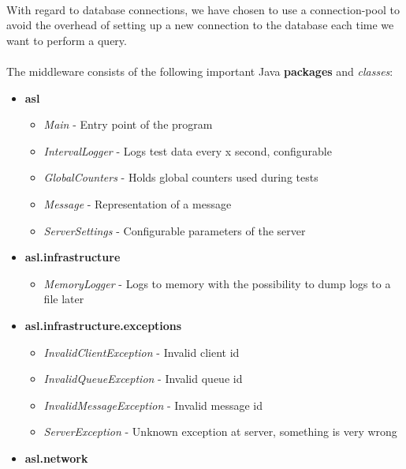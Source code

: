 \documentclass{article}
\begin{document}
            \\
            With regard to database connections, we have chosen to use a connection-pool to avoid the overhead of setting up a new connection to the database each time we want to perform a query.\\
            \\
            The middleware consists of the following important Java \textbf{packages} and \textit{classes}:
            \begin{itemize}
                \item \textbf{asl}
                \begin{itemize}
                    \item \textit{Main} - Entry point of the program
                    \item \textit{IntervalLogger} - Logs test data every x second, configurable
                    \item \textit{GlobalCounters} - Holds global counters used during tests
                    \item \textit{Message} - Representation of a message
                    \item \textit{ServerSettings} - Configurable parameters of the server
                \end{itemize}
                \item \textbf{asl.infrastructure}
                \begin{itemize}
                    \item \textit{MemoryLogger} - Logs to memory with the possibility to dump logs to a file later
                \end{itemize}
                \item \textbf{asl.infrastructure.exceptions}
                \begin{itemize}
                    \item \textit{InvalidClientException} - Invalid client id
                    \item \textit{InvalidQueueException} - Invalid queue id
                    \item \textit{InvalidMessageException} - Invalid message id
                    \item \textit{ServerException} - Unknown exception at server, something is very wrong
                \end{itemize}
                \item \textbf{asl.network}
                \begin{itemize}

\end{itemize}
\end{itemize}
\end{document}
